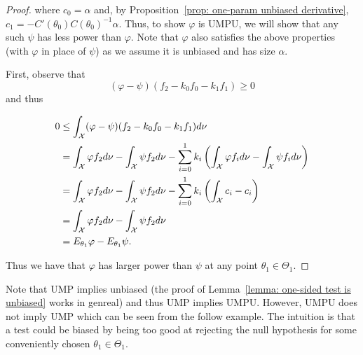 \documentclass[twoside, a4paper, 10pt]{amsart}
\begin{document}
\begin{proof}
where $c_0 = \alpha$ and, by Proposition~\ref{prop: one-param unbiased derivative}, $c_1 = -C'(\theta_0) C(\theta_0)^{-1} \alpha $. Thus, to show $\varphi$ is UMPU, we will show that any such $\psi$ has less power than $\varphi$. Note that $\varphi$ also satisfies the above properties (with $\varphi$ in place of $\psi$) as we assume it is unbiased and has size $\alpha$.

First, observe that $$(\varphi - \psi)(f_2 - k_0f_0 - k_1f_1) \geq 0$$ and thus

\begin{align*} 
0 &\leq \int_{\mathcal{X}} (\varphi - \psi)(f_2 - k_0f_0 - k_1f_1) d\nu \\
&= \int_{\mathcal{X}} \varphi f_2 d\nu - \int_{\mathcal{X}} \psi f_2 d\nu - \sum_{i=0}^1 k_i \left( \int_{\mathcal{X}} \varphi f_i d\nu - \int_{\mathcal{X}} \psi f_i d\nu \right) \\
&= \int_{\mathcal{X}} \varphi f_2 d\nu - \int_{\mathcal{X}} \psi f_2 d\nu - \sum_{i=0}^1 k_i \left( \int_{\mathcal{X}} c_i - c_i\right) \\ 
&= \int_{\mathcal{X}} \varphi f_2 d\nu - \int_{\mathcal{X}} \psi f_2 d\nu \\ 
&= E_{\theta_1} \varphi - E_{\theta_1} \psi.
\end{align*}

Thus we have that $\varphi$ has larger power than $\psi$ at any point $\theta_1 \in \Theta_1$. \end{proof}


Note that UMP implies unbiased (the proof of Lemma~\ref{lemma: one-sided test is unbiased} works in genreal) and thus UMP implies UMPU. However, UMPU does not imply UMP which can be seen from the follow example. The intuition is that a test could be biased by being too good at rejecting the null hypothesis for some conveniently chosen $\theta_1 \in \Theta_1$.
\end{document}
